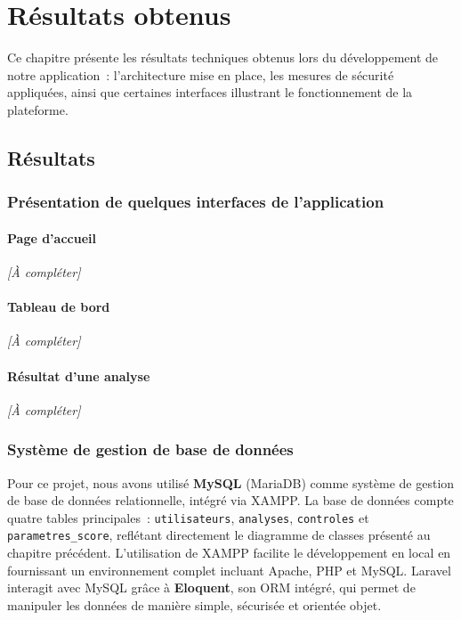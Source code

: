 \chapter{R\'esultats obtenus}
\label{chap:resultats}

Ce chapitre pr\'esente les r\'esultats techniques obtenus lors du d\'eveloppement de
notre application~: l'architecture mise en place, les mesures de s\'ecurit\'e
appliqu\'ees, ainsi que certaines interfaces illustrant le fonctionnement de la
plateforme.

\section{R\'esultats}

\subsection{Pr\'esentation de quelques interfaces de l'application}


\subsubsection{Page d'accueil}
\textit{[\`A compl\'eter]}

\subsubsection{Tableau de bord}
\textit{[\`A compl\'eter]}

\subsubsection{R\'esultat d'une analyse}
\textit{[\`A compl\'eter]}

\subsection{Syst\`eme de gestion de base de donn\'ees}

Pour ce projet, nous avons utilis\'e \textbf{MySQL} (MariaDB) comme syst\`eme de
gestion de base de donn\'ees relationnelle, int\'egr\'e via XAMPP. La base de donn\'ees
compte quatre tables principales~: \texttt{utilisateurs}, \texttt{analyses},
\texttt{controles} et \texttt{parametres\_score}, refl\'etant directement le
diagramme de classes pr\'esent\'e au chapitre pr\'ec\'edent. L'utilisation de XAMPP
facilite le d\'eveloppement en local en fournissant un environnement complet
incluant Apache, PHP et MySQL. Laravel interagit avec MySQL gr\^ace \`a
\textbf{Eloquent}, son ORM int\'egr\'e, qui permet de manipuler les donn\'ees de
mani\`ere simple, s\'ecuris\'ee et orient\'ee objet.

